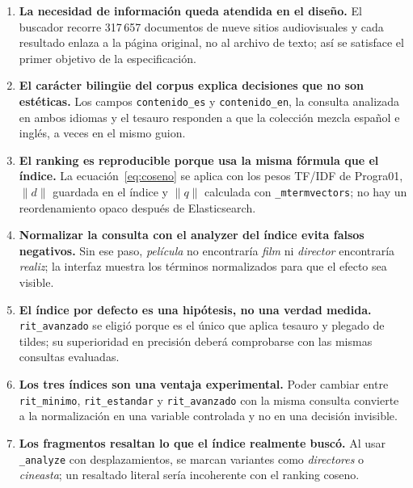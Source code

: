 \documentclass[11pt,spanish]{article}
\begin{document}
\begin{enumerate}[label=\textbf{C\arabic*}.]
  \item \textbf{La necesidad de información queda atendida en el diseño.} El
    buscador recorre 317\,657 documentos de nueve sitios audiovisuales y cada
    resultado enlaza a la página original, no al archivo de texto; así se
    satisface el primer objetivo de la especificación.

  \item \textbf{El carácter bilingüe del corpus explica decisiones que no son
    estéticas.} Los campos \texttt{contenido\_es} y \texttt{contenido\_en}, la
    consulta analizada en ambos idiomas y el tesauro responden a que la
    colección mezcla español e inglés, a veces en el mismo guion.

  \item \textbf{El ranking es reproducible porque usa la misma fórmula que el
    índice.} La ecuación~\ref{eq:coseno} se aplica con los pesos TF/IDF de
    Progra01, $\|d\|$ guardada en el índice y $\|q\|$ calculada con
    \texttt{\_mtermvectors}; no hay un reordenamiento opaco después de
    Elasticsearch.

  \item \textbf{Normalizar la consulta con el analyzer del índice evita falsos
    negativos.} Sin ese paso, \textit{película} no encontraría \textit{film} ni
    \textit{director} encontraría \textit{realiz}; la interfaz muestra los
    términos normalizados para que el efecto sea visible.

  \item \textbf{El índice por defecto es una hipótesis, no una verdad medida.}
    \texttt{rit\_avanzado} se eligió porque es el único que aplica tesauro y
    plegado de tildes; su superioridad en precisión deberá comprobarse con las
    mismas consultas evaluadas.

  \item \textbf{Los tres índices son una ventaja experimental.} Poder cambiar
    entre \texttt{rit\_minimo}, \texttt{rit\_estandar} y \texttt{rit\_avanzado}
    con la misma consulta convierte a la normalización en una variable
    controlada y no en una decisión invisible.

  \item \textbf{Los fragmentos resaltan lo que el índice realmente buscó.} Al
    usar \texttt{\_analyze} con desplazamientos, se marcan variantes como
    \textit{directores} o \textit{cineasta}; un resaltado literal sería
    incoherente con el ranking coseno.


\end{enumerate}
\end{document}
